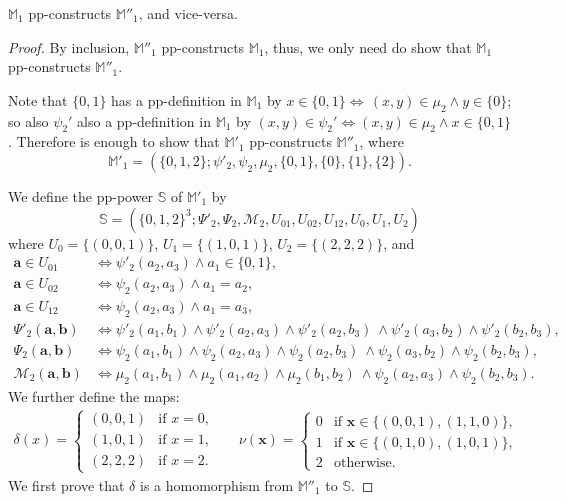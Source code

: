 \documentclass[10pt,a4paper]{amsart}
\newcommand{\struct}[1]{\mathbb{#1}}
\begin{document}
\begin{lemma} \label{lemma:extensionm1}
$\struct{M}_1$ pp-constructs $\struct{M}''_1$, and vice-versa.
\end{lemma}

\begin{proof}
By inclusion, $\struct{M}''_1$ pp-constructs $\struct{M}_1$, thus, we only need do show that $\struct{M}_1$ pp-constructs $\struct{M}''_1$.

Note that $\{0,1\}$ has a pp-definition in $\mathbb M_1$ by $x \in \{0,1\} \Leftrightarrow  \, (x,y) \in  \mu_2\wedge y \in \{0\}$; so also $\psi_2'$ also a pp-definition in $\mathbb M_1$ by $(x,y) \in \psi_2' \Leftrightarrow (x,y) \in\mu_2 \land x \in \{0,1\}$. Therefore is enough to show that $\struct{M}'_1$ pp-constructs $\struct{M}''_1$, where 
\[\struct{M}'_1 = (\{0,1,2\};\psi'_2, \psi_2, \mu_2, \{0,1\}, \{0\},\{1\},\{2\}).\]

We define the pp-power $\struct{S}$ of $\struct{M}'_1$ by
\[\struct{S}=(\{0,1,2\}^3;\Psi'_2,\Psi_2,\mathcal M_2,U_{01},U_{02},U_{12},U_0,U_1,U_2)\]
where $U_0 = \{(0,0,1)\}$, $U_1 = \{(1,0,1)\}$, $U_2 = \{(2,2,2)\}$, and
\begin{align*}
\boldsymbol{a}\in U_{01} &\Leftrightarrow\psi'_2(a_2,a_3)\wedge a_1\in\{0,1\},
    \\\boldsymbol{a} \in U_{02} &\Leftrightarrow \psi_2(a_2,a_3) \wedge a_1=a_2,
    \\ \boldsymbol{a} \in U_{12} &\Leftrightarrow \psi_2(a_2,a_3)\wedge a_1=a_3,\\
    \Psi'_2(\boldsymbol{a},\boldsymbol{b}) &\Leftrightarrow \psi'_2(a_1,b_1) \wedge \psi'_2(a_2,a_3) \wedge \psi'_2(a_2,b_3)\ \wedge \psi'_2(a_3,b_2)\wedge \psi'_2(b_2,b_3),
    \\\Psi_2(\boldsymbol{a},\boldsymbol{b}) &\Leftrightarrow \psi_2(a_1,b_1) \wedge \psi_2(a_2,a_3) \wedge \psi_2(a_2,b_3)\ \wedge \psi_2(a_3,b_2)\wedge \psi_2(b_2,b_3),\\
    \mathcal M_2(\boldsymbol{a},\boldsymbol{b}) &\Leftrightarrow \mu_2(a_1,b_1)\wedge \mu_2(a_1,a_2)\wedge \mu_2(b_1,b_2)\ \wedge \psi_2(a_2,a_3)\wedge \psi_2(b_2,b_3).
\end{align*}
We further define the maps:
\begin{align*}\label{eq:mapHom3}
 \delta(x)=\begin{cases}
   (0,0,1) & \text{if } x = 0,\\
   (1,0,1) & \text{if } x = 1,\\
   (2,2,2) & \text{if } x = 2.
   \end{cases}
 &&\nu(\boldsymbol{x})=\begin{cases}
   0 & \text{if } \boldsymbol{x} \in \{(0,0,1),(1,1,0)\},\\
   1 & \text{if } \boldsymbol{x} \in \{(0,1,0),(1,0,1)\},\\
   2 & \text{otherwise}.
   \end{cases}
\end{align*}
We first prove that $\delta$ is a homomorphism from $\struct{M}''_1$ to $\struct{S}$.


\end{proof}
\end{document}
